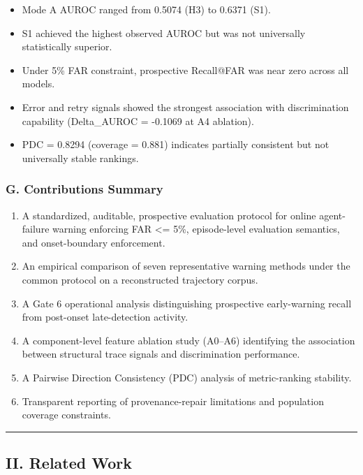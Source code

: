 \documentclass[
]{article}
\providecommand{\tightlist}{%
  \setlength{\itemsep}{0pt}\setlength{\parskip}{0pt}}
\begin{document}
\begin{itemize}
\tightlist
\item
  Mode A AUROC ranged from 0.5074 (H3) to 0.6371 (S1).
\item
  S1 achieved the highest observed AUROC but was not universally
  statistically superior.
\item
  Under 5\% FAR constraint, prospective Recall@FAR was near zero across
  all models.
\item
  Error and retry signals showed the strongest association with
  discrimination capability (Delta\_AUROC = -0.1069 at A4 ablation).
\item
  PDC = 0.8294 (coverage = 0.881) indicates partially consistent but not
  universally stable rankings.
\end{itemize}

\subsubsection{G. Contributions Summary}\label{g.-contributions-summary}

\begin{enumerate}
\def\labelenumi{\arabic{enumi}.}
\tightlist
\item
  A standardized, auditable, prospective evaluation protocol for online
  agent-failure warning enforcing FAR \textless= 5\%, episode-level
  evaluation semantics, and onset-boundary enforcement.
\item
  An empirical comparison of seven representative warning methods under
  the common protocol on a reconstructed trajectory corpus.
\item
  A Gate 6 operational analysis distinguishing prospective early-warning
  recall from post-onset late-detection activity.
\item
  A component-level feature ablation study (A0--A6) identifying the
  association between structural trace signals and discrimination
  performance.
\item
  A Pairwise Direction Consistency (PDC) analysis of metric-ranking
  stability.
\item
  Transparent reporting of provenance-repair limitations and population
  coverage constraints.
\end{enumerate}

\begin{center}\rule{0.5\linewidth}{0.5pt}\end{center}

\subsection{II. Related Work}\label{ii.-related-work}
\end{document}
